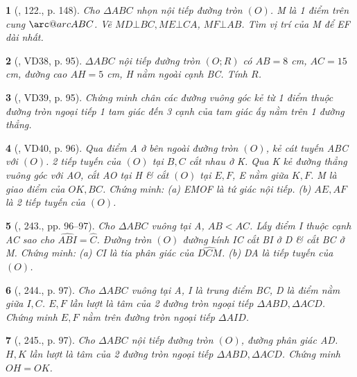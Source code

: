 \documentclass{article}
\makeatletter
\newcommand{\arc@char}{{\usefont{U}{tipa}{m}{n}\symbol{62}}}%
\newcommand{\arc}[1]{\mathpalette\arc@arc{#1}}
\newcommand{\arc@arc}[2]{%
	\sbox0{$\m@th#1#2$}%
	\vbox{
		\hbox{\resizebox{\wd0}{\height}{\arc@char}}
		\nointerlineskip
		\box0
	}%
}
\newtheorem{baitoan}{}
\makeatother
\begin{document}
\begin{baitoan}[\cite{Tuyen_Toan_9_old}, 122., p. 148]
	Cho $\Delta ABC$ nhọn nội tiếp đường tròn $(O)$. M là 1 điểm trên cung $\arc{ABC}$. Vẽ $MD\bot BC,ME\bot CA$, $MF\bot AB$. Tìm vị trí của M để EF dài nhất. 
\end{baitoan}

\begin{baitoan}[\cite{Binh_Toan_9_tap_2}, VD38, p. 95]
	$\Delta ABC$ nội tiếp đường tròn $(O;R)$ có $AB = 8$ {\rm cm}, $AC = 15$ {\rm cm}, đường cao $AH = 5$ {\rm cm}, H nằm ngoài cạnh BC. Tính $R$.
\end{baitoan}

\begin{baitoan}[\cite{Binh_Toan_9_tap_2}, VD39, p. 95]
	Chứng minh chân các đường vuông góc kẻ từ 1 điểm thuộc đường tròn ngoại tiếp 1 tam giác đến 3 cạnh của tam giác ấy nằm trên 1 đường thẳng.
\end{baitoan}

\begin{baitoan}[\cite{Binh_Toan_9_tap_2}, VD40, p. 96]
	Qua điểm A ở bên ngoài đường tròn $(O)$, kẻ cát tuyến ABC với $(O)$. 2 tiếp tuyến của $(O)$ tại $B,C$ cắt nhau ở K. Qua K kẻ đường thẳng vuông góc với AO, cắt AO tại H \& cắt $(O)$ tại $E,F$, E nằm giữa $K,F$. M là giao điểm của $OK,BC$. Chứng minh: (a) EMOF là tứ giác nội tiếp. (b) $AE,AF$ là 2 tiếp tuyến của $(O)$.
\end{baitoan}

\begin{baitoan}[\cite{Binh_Toan_9_tap_2}, 243., pp. 96--97]
	Cho $\Delta ABC$ vuông tại A, $AB < AC$. Lấy điểm I thuộc cạnh AC sao cho $\widehat{ABI} = \widehat{C}$. Đường tròn $(O)$ đường kính IC cắt BI ở D \& cắt BC ở M. Chứng minh: (a) CI là tia phân giác của $\widehat{DCM}$. (b) DA là tiếp tuyến của $(O)$.
\end{baitoan}

\begin{baitoan}[\cite{Binh_Toan_9_tap_2}, 244., p. 97]
	Cho $\Delta ABC$ vuông tại A, I là trung điểm BC, D là điểm nằm giữa $I,C$. $E,F$ lần lượt là tâm của 2 đường tròn ngoại tiếp $\Delta ABD,\Delta ACD$. Chứng minh $E,F$ nằm trên đường tròn ngoại tiếp $\Delta AID$.
\end{baitoan}

\begin{baitoan}[\cite{Binh_Toan_9_tap_2}, 245., p. 97]
	Cho $\Delta ABC$ nội tiếp đường tròn $(O)$, đường phân giác AD. $H,K$ lần lượt là tâm của 2 đường tròn ngoại tiếp $\Delta ABD,\Delta ACD$. Chứng minh $OH = OK$.
\end{baitoan}
\end{document}
